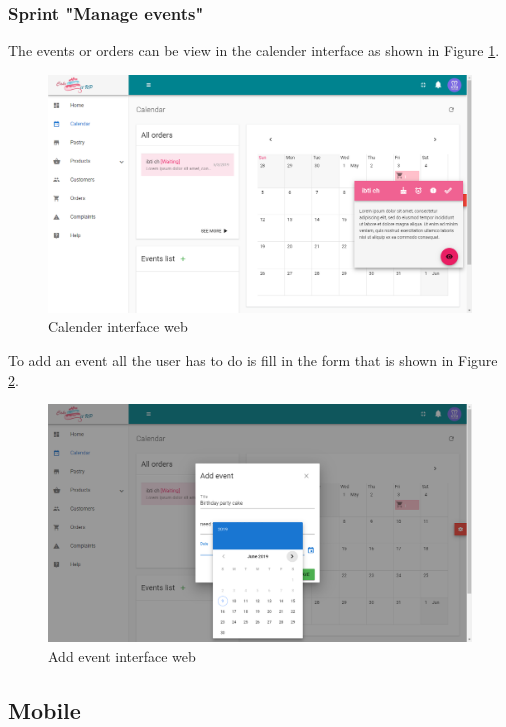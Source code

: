 \documentclass[12pt,a4paper]{report}
\begin{document}
\subsubsection*{Sprint "Manage events"}
The events or orders can be view in the calender interface as shown in Figure \ref{listevents-interface}.
\begin{figure}[H]
	\centering
	\includegraphics[width=5.6in,keepaspectratio]{listevents.png}
	\caption{Calender interface web}
	\label{listevents-interface}
\end{figure}
To add an event all the user has to do is fill in the form that is shown in Figure \ref{addevent-interface}.
\begin{figure}[H]
	\centering
	\includegraphics[width=5.6in,keepaspectratio]{addevent.png}
	\caption{Add event interface web}
	\label{addevent-interface}
\end{figure}

\subsection{Mobile}
\end{document}
